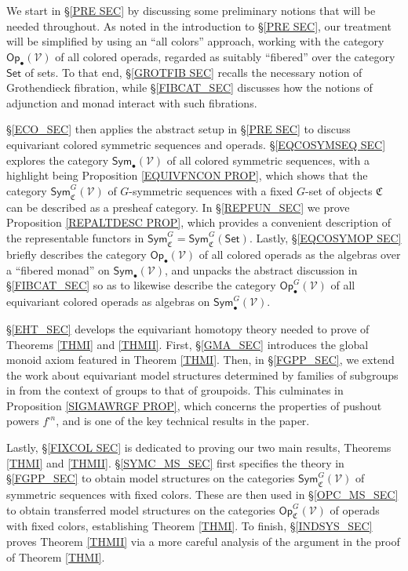 \documentclass[a4paper,10pt
]{article}%
\numberwithin{equation}{section}
\numberwithin{figure}{section}
\theoremstyle{definition} %
\newcommand{\Op}{\mathsf{Op}}%
\newcommand{\V}{\ensuremath{\mathcal V}}
\newcommand{\1}{\ensuremath{\mathbbm 1}}%
\begin{document}
We start in \S \ref{PRE SEC} by discussing some preliminary notions that will be needed throughout.
As noted in the introduction to 
\S \ref{PRE SEC}, our treatment will be simplified by 
using an ``all colors'' approach,
working with the category $\Op_\bullet(\V)$ of all colored operads,
regarded as suitably ``fibered'' over the category $\mathsf{Set}$
of sets.
To that end, 
\S \ref{GROTFIB SEC} recalls the necessary
notion of Grothendieck fibration, 
while \S \ref{FIBCAT_SEC}
discusses how the notions of adjunction and monad 
interact with such fibrations.

\S \ref{ECO_SEC} then applies the abstract setup in \S \ref{PRE SEC}
to discuss equivariant colored symmetric sequences and operads. 
\S \ref{EQCOSYMSEQ SEC}
explores the category
$\mathsf{Sym}_{\bullet}(\V)$
of all colored symmetric sequences,
with a highlight being
Proposition \ref{EQUIVFNCON PROP},
which shows that the category
$\mathsf{Sym}^G_{\mathfrak{C}}(\V)$
of $G$-symmetric sequences with a fixed $G$-set of objects
$\mathfrak{C}$ can be described as a presheaf category.
In \S \ref{REPFUN_SEC} we prove
Proposition \ref{REPALTDESC PROP},
which provides a convenient description of the representable functors in 
$\mathsf{Sym}^G_{\mathfrak{C}} = \mathsf{Sym}^G_{\mathfrak{C}}(\mathsf{Set})$.
%
Lastly, \S \ref{EQCOSYMOP SEC}
briefly describes the category 
$\mathsf{Op}_{\bullet}(\V)$ 
of all colored operads as the algebras over a ``fibered monad''
on  
$\mathsf{Sym}_{\bullet}(\V)$,
and unpacks the abstract discussion in \S \ref{FIBCAT_SEC}
so as to likewise describe the category 
$\mathsf{Op}_{\bullet}^G(\V)$ 
of all equivariant colored operads
as algebras on 
$\mathsf{Sym}^G_{\bullet}(\V)$.


\S \ref{EHT_SEC} develops the equivariant homotopy theory
needed to prove of Theorems \ref{THMI} and \ref{THMII}.
First, \S \ref{GMA_SEC} introduces the global monoid axiom featured in Theorem \ref{THMI}.
Then, in \S \ref{FGPP_SEC}, 
we extend %
the work 
about equivariant model structures determined by families of subgroups in \cite[\S 6]{BP21}
from the context of groups to that of groupoids.
This culminates in 
Proposition \ref{SIGMAWRGF PROP},
which concerns the properties of pushout powers $f^{\square n}$,
and is one of the key technical results in the paper. %


Lastly, \S \ref{FIXCOL SEC}
is dedicated to proving our two main results, 
Theorems \ref{THMI} and \ref{THMII}.
%
\S \ref{SYMC_MS_SEC} first specifies the theory in
\S \ref{FGPP_SEC}
to obtain model structures on the categories
$\mathsf{Sym}^G_{\mathfrak{C}}(\V)$ of symmetric sequences with fixed colors.
These are then used in \S \ref{OPC_MS_SEC}
to obtain transferred model structures on the 
categories
$\mathsf{Op}^G_{\mathfrak{C}}(\V)$
of operads with fixed colors, establishing Theorem \ref{THMI}.
To finish, \S \ref{INDSYS_SEC} proves Theorem \ref{THMII}
via a more careful analysis of the argument in the proof of 
Theorem \ref{THMI}.
\end{document}

